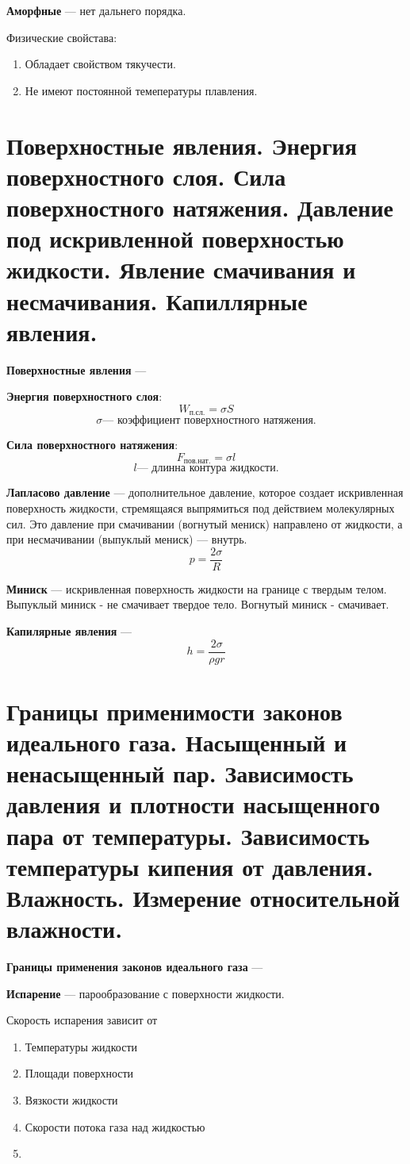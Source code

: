 \documentclass{report}
\begin{document}
{\bf Аморфные} ---
нет дальнего порядка.

Физические свойстава:
\begin{enumerate}
  \item Обладает свойством тякучести.
  \item Не имеют постоянной темепературы плавления.
\end{enumerate}



\part{Поверхностные явления.
Энергия поверхностного слоя.
Сила поверхностного натяжения.
Давление под искривленной поверхностью жидкости.
Явление смачивания и несмачивания.
Капиллярные явления.}

{\bf Поверхностные явления} ---

{\bf Энергия поверхностного слоя}:
$$
W_\textrm{п.сл.}=\sigma S
$$
$$
\sigma \textrm{--- коэффициент поверхностного натяжения.}
$$

{\bf Сила поверхностного натяжения}:
$$
F_\textrm{пов.нат.}=\sigma l
$$
$$
l \textrm{--- длинна контура жидкости.}
$$

{\bf Лапласово давление} ---
дополнительное давление, которое создает искривленная поверхность жидкости, стремящаяся 
выпрямиться под действием молекулярных сил. Это давление при смачивании (вогнутый мениск) 
направлено от жидкости, а при несмачивании (выпуклый мениск) — внутрь.
$$
p=\frac{2\sigma}{R}
$$

{\bf Миниск} ---
искривленная поверхность жидкости на границе с твердым телом.
Выпуклый миниск - не смачивает твердое тело.
Вогнутый миниск - смачивает.

{\bf Капилярные явления} ---
$$
h=\frac{2\sigma}{\rho g r}
$$


\part{Границы применимости законов идеального газа. 
Насыщенный и ненасыщенный пар. 
Зависимость давления и плотности насыщенного пара от температуры. 
Зависимость температуры кипения от давления. 
Влажность.
Измерение относительной влажности.}

{\bf Границы применения законов идеального газа} ---

{\bf Испарение} ---
парообразование с поверхности жидкости.

Скорость испарения зависит от 
\begin{enumerate}
  \item Температуры жидкости
  \item Площади поверхности
  \item Вязкости жидкости
  \item Скорости потока газа над жидкостью
  \item 
\end{enumerate}
\end{document}

